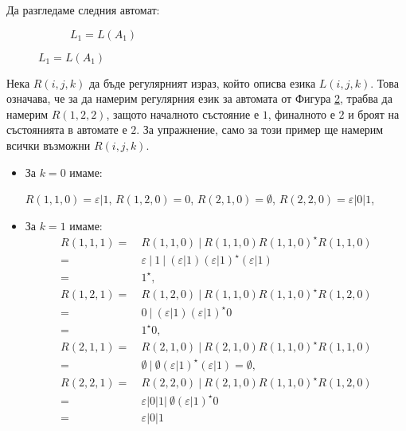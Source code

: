 \begin{example}
  Да разгледаме следния автомат:
  
  \begin{figure}[h!]
    \begin{subfigure}[b]{0.3\textwidth}
      \label{subf:a1}
      \caption{$L_1 = L(A_1)$}
    \end{subfigure}
 \end{figure}

Нека $R(i,j,k)$ да бъде регулярният израз, който описва езика $L(i,j,k)$.
Това означава, че за да намерим регулярния език за автомата от Фигура \ref{subf:a1}, 
трабва да намерим $R(1,2,2)$, защото началното състояние е $1$, финалното е $2$ и 
броят на състоянията в автомате е $2$.
За упражнение, само за този пример ще намерим всички възможни $R(i,j,k)$.
\begin{itemize}
\item 
  За $k = 0$ имаме:
  
  $R(1,1,0) = \varepsilon\vert 1$, $R(1,2,0) = 0$, $R(2,1,0) = \emptyset$, $R(2,2,0) = \varepsilon\vert 0 \vert 1$,
\item
  За $k = 1$ имаме:
  \begin{align*}
    R(1,1,1) =\ & R(1,1,0)\ \vert\ R(1,1,0) R(1,1,0)^\star R(1,1,0) \\
    =\ &\varepsilon\ \vert\ 1\ \vert\ (\varepsilon \vert 1)(\varepsilon\vert 1)^\star(\varepsilon \vert 1)\\
    =\ & 1^\star,\\
    R(1,2,1) =\ & R(1,2,0)\ \vert\ R(1,1,0) R(1,1,0)^\star R(1,2,0)\\
    =\ & 0\ \vert\ (\varepsilon \vert 1)(\varepsilon \vert 1)^\star0\\
    =\ & 1^\star0,\\
    R(2,1,1) =\ & R(2,1,0)\ \vert\ R(2,1,0)R(1,1,0)^\star R(1,1,0) \\
    =\ & \emptyset\ \vert\ \emptyset (\varepsilon\vert 1)^\star(\varepsilon \vert 1) = \emptyset,\\
    R(2,2,1) =\ & R(2,2,0)\ \vert\ R(2,1,0)R(1,1,0)^\star R(1,2,0)\\
    =\ & \varepsilon\vert 0 \vert 1\vert\ \emptyset(\varepsilon \vert 1)^\star0\\
    =\ &  \varepsilon\vert 0 \vert 1
  \end{align*}
    

\end{itemize}
\end{example}
